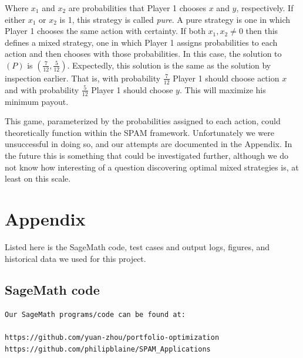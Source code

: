 \documentclass{article}
\begin{document}
Where $x_{1}$ and $x_{2}$ are probabilities that Player 1 chooses $x$ and $y$, respectively. If either $x_{1}$ or $x_{2}$ is 1, this strategy is called \textit{pure}. A pure strategy is one in which Player 1 chooses the same action with certainty. If both $x_{1}, x_{2} \ne 0$ then this defines a mixed strategy, one in which Player 1 assigns probabilities to each action and then chooses with those probabilities. In this case, the solution to $(P)$ is $(\frac{7}{12}, \frac{5}{12})$. Expectedly, this solution is the same as the solution by inspection earlier. That is, with probability $\frac{7}{12}$ Player 1 should choose action $x$ and with probability $\frac{5}{12}$ Player 1 should choose $y$. This will maximize his minimum payout.

This game, parameterized by the probabilities assigned to each action, could theoretically function within the SPAM framework. Unfortunately we were unsuccessful in doing so, and our attempts are documented in the Appendix. In the future this is something that could be investigated further, although we do not know how interesting of a question discovering optimal mixed strategies is, at least on this scale.

\pagebreak

\section{Appendix}

Listed here is the SageMath code, test cases and output logs, figures, and historical data we used for this project.

\subsection{SageMath code}

\begin{verbatim}
Our SageMath programs/code can be found at:

https://github.com/yuan-zhou/portfolio-optimization
https://github.com/philipblaine/SPAM_Applications

\end{verbatim}
    
\end{document}
